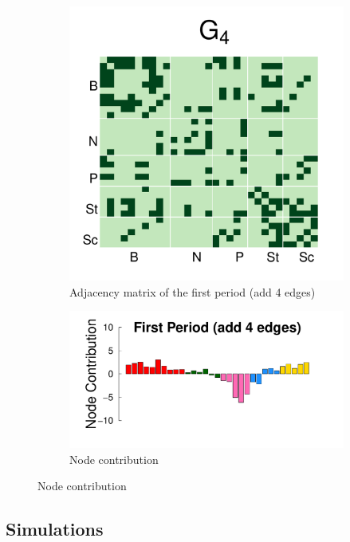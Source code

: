 \documentclass[12pt]{article}
\begin{document}
\begin{figure}[H]
	\centering
	\begin{subfigure}[b]{0.3\textwidth}
		\includegraphics[width=\textwidth]{../../Figure/sim_Adj4.pdf}
		\caption{Adjacency matrix of the first period (add 4 edges)}
		\label{fig:step4}
	\end{subfigure}
	\begin{subfigure}[b]{0.6\textwidth}
		\includegraphics[width=\textwidth]{../../Figure/step4.pdf}
		\caption{Node contribution}
		\label{fig:adj.step4}
	\end{subfigure}
\end{figure}

\subsection*{Simulations}
\end{document}
